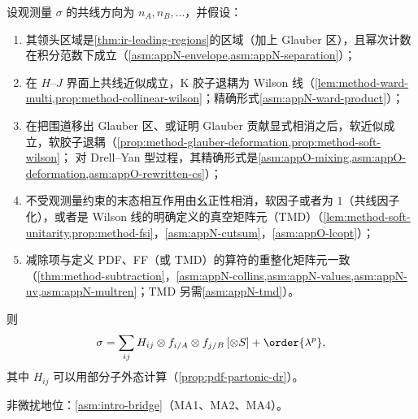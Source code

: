 \begin{theorem}\label{thm:method-template}
设观测量 $\sigma$ 的共线方向为 $n_A,n_B,\ldots$，并假设：
\begin{enumerate}[label=\textbf{(H\arabic*)},leftmargin=3.2em,itemsep=1pt,topsep=2pt]
\item 其领头区域是\cref{thm:ir-leading-regions}的区域（加上 Glauber 区），且幂次计数在积分范数下成立（\cref{asm:appN-envelope,asm:appN-separation}）；
\item 在 $H$--$J$ 界面上共线近似成立，K 胶子退耦为 Wilson 线（\cref{lem:method-ward-multi,prop:method-collinear-wilson}；精确形式\cref{asm:appN-ward-product}）；
\item 在把围道移出 Glauber 区、或证明 Glauber 贡献显式相消之后，软近似成立，软胶子退耦（\cref{prop:method-glauber-deformation,prop:method-soft-wilson}；
  对 Drell--Yan 型过程，其精确形式是\cref{asm:appO-mixing,asm:appO-deformation,asm:appO-rewritten-cs}）；
\item 不受观测量约束的末态相互作用由幺正性相消，软因子或者为 $1$（共线因子化），或者是 Wilson 线的明确定义的真空矩阵元（TMD）（\cref{lem:method-soft-unitarity,prop:method-fsi}，\cref{asm:appN-cutsum}，\cref{asm:appO-lcopt}）；
\item 减除项与定义 PDF、FF（或 TMD）的算符的重整化矩阵元一致（\cref{thm:method-subtraction}，\cref{asm:appN-collins,asm:appN-values,asm:appN-uv,asm:appN-multren}；TMD 另需\cref{asm:appN-tmd}）。
\end{enumerate}
则
\begin{equation}\label{eq:method-template}
\sigma=\sum_{ij}H_{ij}\otimes f_{i/A}\otimes f_{j/B}\,[\otimes S]+\order{\lambda^p} ,
\end{equation}
其中 $H_{ij}$ 可以用部分子外态计算（\cref{prop:pdf-partonic-dr}）。

非微扰地位：\cref{asm:intro-bridge}（MA1、MA2、MA4）。
\end{theorem}


